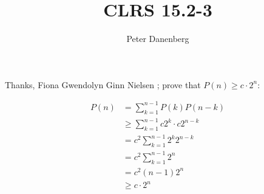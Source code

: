 \documentclass{article}
\title{CLRS 15.2-3}
\author{Peter Danenberg}
\begin{document}
\maketitle

Thanks, Fiona Gwendolyn Ginn Nielsen \cite{nielsen:03}; prove that
$P(n) \geq c\cdot2^n$:

\begin{align}
  P(n) &= \sum_{k=1}^{n-1}P(k)P(n-k)\\
  &\geq \sum_{k=1}^{n-1}c2^k\cdot c2^{n-k}\\
  &= c^2\sum_{k=1}^{n-1}2^k2^{n-k}\\
  &= c^2\sum_{k=1}^{n-1}2^n\\
  &= c^2(n-1)2^n\\
  &\geq c\cdot2^n
\end{align}


\end{document}
